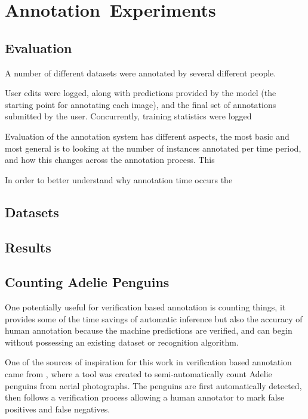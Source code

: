 \chapter{Annotation~Experiments}
\label{chap:annotation} 




\section {Evaluation}

A number of different datasets were annotated by several different people. 


User edits were logged, along with predictions provided by the model (the starting point for annotating each image), and the final set of annotations submitted by the user. Concurrently, training statistics were logged 


Evaluation of the annotation system has different aspects, the most basic and most general is to looking at the number of instances annotated per time period, and how this changes across the annotation process. This 

In order to better understand why annotation time occurs the


\section{Datasets}





\section{Results}

\section{Counting Adelie Penguins}

One potentially useful for verification based annotation is counting things, it provides some of the time savings of automatic inference but also the accuracy of human annotation because the machine predictions are verified, and can begin without possessing an existing dataset or recognition algorithm.


One of the sources of inspiration for this work in verification based annotation came from \cite{McNeill2011}, where a tool was created to semi-automatically count Adelie penguins from aerial photographs. The penguins are first automatically detected, then follows a verification process allowing a human annotator to mark false positives and false negatives.

